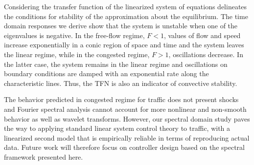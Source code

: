 \documentclass[preprint]{elsarticle}
\begin{document}
Considering the transfer function of the linearized system of equations delineates the conditions for stability of the approximation about the equilibrium. The time domain responses we derive show that the system is unstable when one of the eigenvalues is negative. In the free-flow regime, $F < 1$, values of flow and speed increase exponentially in a conic region of space and time and the system leaves the linear regime, while in the congested regime, $F>1$, oscillations decrease. In the latter case, the system remains in the linear regime and oscillations on boundary conditions are damped with an exponential rate along the characteristic lines. Thus, the TFN is also an indicator of convective stability.

The behavior predicted in congested regime for traffic does not present shocks and Fourier spectral analysis cannot account for more nonlinear and non-smooth behavior as well as wavelet transforms. However, our spectral domain study paves the way to applying standard linear system control theory to traffic, with a linearized second model that is empirically reliable in terms of reproducing actual data. Future work will therefore focus on controller design based on the spectral framework presented here.

\end{document}
